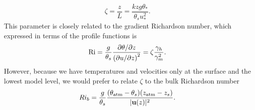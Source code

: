 \documentclass[10pt]{article}
\begin{document}
\begin{equation*}
\zeta = \frac{z}{L} = \frac{k z g \theta_*}{\theta_s u_*^2}.
\end{equation*}
This parameter is closely related to the gradient Richardson number, which expressed in terms of the profile functions is
\begin{equation*}
\mathrm{Ri} = \frac{g}{\theta_s} \frac{\partial \theta / \partial z}{\qty(\partial u / \partial z)^2} = \zeta \frac{\gamma_h}{\gamma_m^2}.
\end{equation*}
However, because we have temperatures and velocities only at the surface and the lowest model level, we would prefer to relate $\zeta$ to the bulk Richardson number
\begin{equation} \label{eqn:Ri_b}
Ri_b = \frac{g}{\theta_s}\frac{(\theta_{\mathrm{atm}} - \theta_s)(z_{\mathrm{atm}} - z_s)}{|{\bf u}(z)|^2}.
\end{equation}
\end{document}
